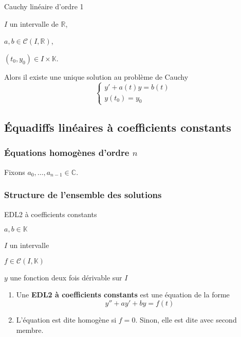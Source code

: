     \begin{theo}{Cauchy linéaire d’ordre 1}{}
        \begin{soient}
            \item $I$ un intervalle de $\mathbb{R}$,
            \item $a,b \in \mathcal{C}(I,\mathbb{R})$,
            \item $(t_0,y_0) \in I \times \mathbb{K}$.
        \end{soient}
        Alors il existe une unique solution au problème de Cauchy \[ \left\{ \begin{array}{ll}
        y' + a(t)y = b(t)\\
        y(t_0) = y_0
        \end{array} \right. \]
    \end{theo}

\subsection{Équadiffs linéaires à coefficients constants}

    \subsubsection{Équations homogènes d’ordre $n$}

    Fixons $a_0, \ldots, a_{n-1} \in \mathbb{C}$.

    \subsubsection{Structure de l’ensemble des solutions}

    \begin{defi}{EDL2 à coefficients constants}{}
	    \begin{soient}
		    \item $a,b \in \mathbb{K}$
		    \item $I$ un intervalle
		    \item $f \in \mathcal{C}(I,\mathbb{K})$
		    \item $y$ une fonction deux fois dérivable sur $I$
	    \end{soient}
	    \begin{enumerate}
		    \item Une \textbf{EDL2 à coefficients constants} est une équation de la forme \[ y'' + ay' + by = f(t) \]
		    \item L’équation est dite homogène si $f = 0$. Sinon, elle est dite avec second membre.
	    \end{enumerate}
    \end{defi}

